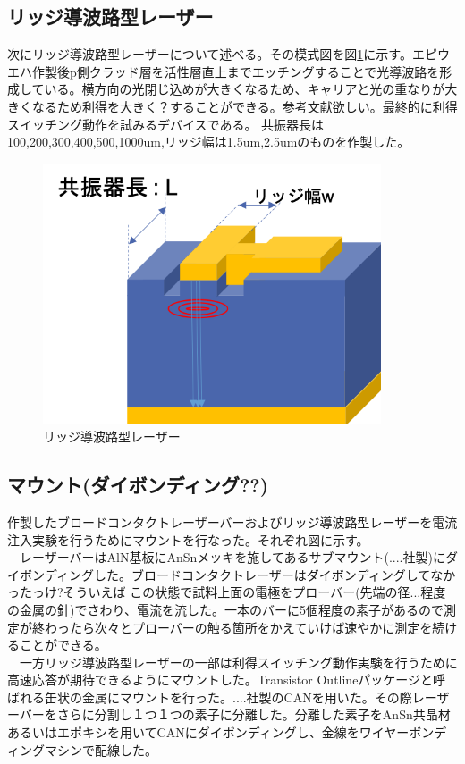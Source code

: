 \subsection{リッジ導波路型レーザー}%
次にリッジ導波路型レーザーについて述べる。その模式図を図\ref{fig_2_1_ridge}に示す。エピウエハ作製後p側クラッド層を活性層直上までエッチングすることで光導波路を形成している。横方向の光閉じ込めが大きくなるため、キャリアと光の重なりが大きくなるため利得を大きく？することができる。参考文献欲しい。最終的に利得スイッチング動作を試みるデバイスである。
共振器長は100,200,300,400,500,1000um,リッジ幅は1.5um,2.5umのものを作製した。
\begin{figure}[t]
	\centering
	\includegraphics[width=10cm]{figure/fig_2_1_ridge.png}
	\caption{リッジ導波路型レーザー}
	\label{fig_2_1_ridge}
\end{figure}
\clearpage
\subsection{マウント(ダイボンディング??)}%
作製したブロードコンタクトレーザーバーおよびリッジ導波路型レーザーを電流注入実験を行うためにマウントを行なった。それぞれ図に示す。\\
　レーザーバーはAlN基板にAnSnメッキを施してあるサブマウント(....社製)にダイボンディングした。ブロードコンタクトレーザーはダイボンディングしてなかったっけ?そういえば
この状態で試料上面の電極をプローバー(先端の径...程度の金属の針)でさわり、電流を流した。一本のバーに5個程度の素子があるので測定が終わったら次々とプローバーの触る箇所をかえていけば速やかに測定を続けることができる。\\
　一方リッジ導波路型レーザーの一部は利得スイッチング動作実験を行うために高速応答が期待できるようにマウントした。Transistor Outlineパッケージと呼ばれる缶状の金属にマウントを行った。....社製のCANを用いた。その際レーザーバーをさらに分割し１つ１つの素子に分離した。分離した素子をAnSn共晶材あるいはエポキシを用いてCANにダイボンディングし、金線をワイヤーボンディングマシンで配線した。


